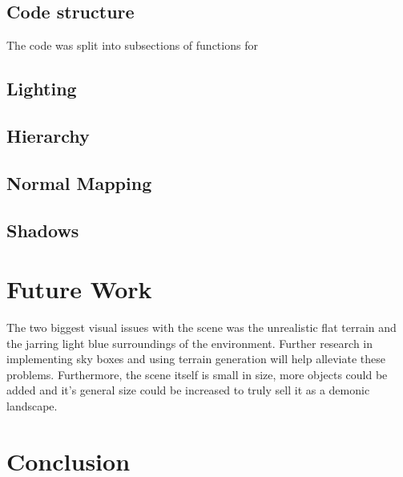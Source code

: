 \documentclass[10pt, a4paper]{article}
\begin{document}
	\subsection{Code structure}
	The code was split into subsections of functions for 
	
	\subsection{Lighting}
	
	\subsection{Hierarchy}
	
	\subsection{Normal Mapping}
	
	\subsection{Shadows}
	
	\section{Future Work}
	The two biggest visual issues with the scene was the unrealistic flat terrain and the jarring light blue surroundings of the environment. Further research in implementing sky boxes and using terrain generation will help alleviate these problems. Furthermore, the scene itself is small in size, more objects could be added and it's general size could be increased to truly sell it as a demonic landscape.

\section{Conclusion}


\end{document}
